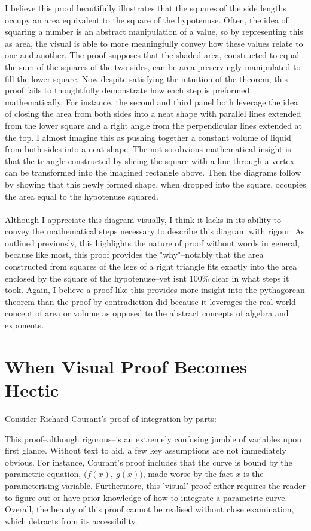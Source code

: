 \documentclass[11pt,a4paper]{article}
\begin{document}
I believe this proof beautifully illustrates that the squares of the side lengths occupy an area equivalent to the square of the hypotenuse. Often, the idea of squaring a number is an abstract manipulation of a value, so by representing this as area, the visual is able to more meaningfully convey how these values relate to one and another. The proof supposes that the shaded area, constructed to equal the sum of the squares of the two sides, can be area-preservingly manipulated to fill the lower square. Now despite satisfying the intuition of the theorem, this proof fails to thoughtfully demonstrate how each step is preformed mathematically. For instance, the second and third panel both leverage the idea of closing the area from both sides into a neat shape with parallel lines extended from the lower square and a right angle from the perpendicular lines extended at the top. I almost imagine this as pushing together a constant volume of liquid from both sides into a neat shape. The not-so-obvious mathematical insight is that the triangle constructed by slicing the square with a line through a vertex can be transformed into the imagined rectangle above. Then the diagrams follow by showing that this newly formed shape, when dropped into the square, occupies the area equal to the hypotenuse squared. \\ \\
Although I appreciate this diagram visually, I think it lacks in its ability to convey the mathematical steps necessary to describe this diagram with rigour. As outlined previously, this highlights the nature of proof without words in general, because like most, this proof provides the "why"--notably that the area constructed from squares of the legs of a right triangle fits exactly into the area enclosed by the square of the hypotenuse--yet isnt 100\% clear in what steps it took. Again, I believe a proof like this provides more insight into the pythagorean theorem than the proof by contradiction did because it leverages the real-world concept of area or volume as opposed to the abstract concepts of algebra and exponents.

\pagebreak
\section{When Visual Proof Becomes Hectic}

Consider Richard Courant's proof of integration by parts: 



This proof--although rigorous--is an extremely confusing jumble of variables upon first glance.  Without text to aid, a few key assumptions are not immediately obvious. For instance, Courant's proof includes that the curve is bound by the parametric equation, $ \big( f(x), \ g(x) \big) $, made worse by the fact $x$ is the parameterising variable.  Furthermore, this 'visual' proof either requires the reader to figure out or have prior knowledge of how to integrate a parametric curve. Overall, the beauty of this proof cannot be realised without close examination, which detracts from its accessibility.
\pagebreak
\end{document}

